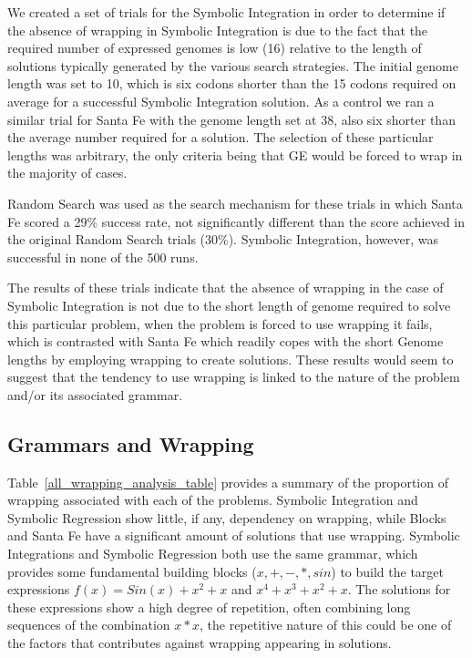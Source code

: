 We created a set of trials for the Symbolic Integration in order to determine if the absence of wrapping in Symbolic Integration is due to the fact that the required number of expressed genomes is low (16) relative to the length of solutions typically generated by the various search strategies.  The initial genome length was set to 10, which is six codons shorter than the 15 codons required on average for a successful Symbolic Integration solution. As a control we ran a similar trial for Santa Fe with the genome length set at 38, also six shorter than the average number required for a solution. The selection of these particular lengths was arbitrary, the only criteria being that GE would be forced to wrap in the majority of cases.

Random Search was used as the search mechanism for these trials in which Santa Fe scored a 29\% success rate, not significantly different than the score achieved in the original Random Search trials (30\%). Symbolic Integration, however, was successful in none of the 500 runs.

The results of these trials indicate that the absence of wrapping in the case of Symbolic Integration is not due to the short length of genome required to solve this particular problem, when the problem is forced to use wrapping it fails, which is contrasted with Santa Fe which readily copes with the short Genome lengths by employing wrapping to create solutions. These results would seem to suggest that the tendency to use wrapping is linked to the nature of the problem and/or its associated grammar.

\subsection{Grammars and Wrapping}
\label{grammar_wrap}Table~\ref{all_wrapping_analysis_table} provides a summary of the proportion of wrapping associated with each of the problems. Symbolic Integration and Symbolic Regression show little, if any, dependency on wrapping, while Blocks and Santa Fe have a significant amount of solutions that use wrapping. Symbolic Integrations and Symbolic Regression both use the same grammar, which provides some fundamental building blocks ($x,+,-,*,sin$) to build the target expressions $f(x) = Sin(x) + x^2 + x$ and $x^4 + x^3 + x^2 + x$. The solutions for these expressions show a high degree of repetition, often combining long sequences of the combination $x * x$, the repetitive nature of this could be one of the factors that contributes against wrapping appearing in solutions.



